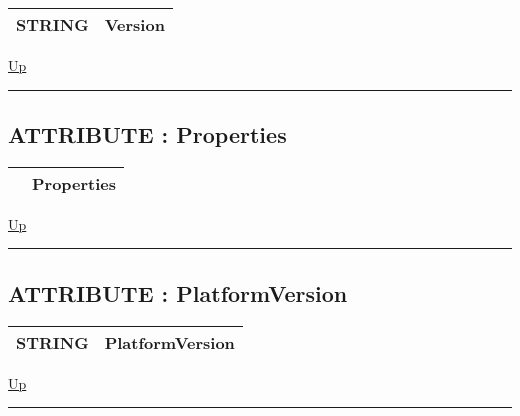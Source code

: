 {\renewcommand{\arraystretch}{1.5}
\begin{tabularx}{\textwidth}{|>{\raggedright\arraybackslash}l|X|}
\hline
\hspace{0pt}STRING & Version \\
\hline
\end{tabularx}
}

\hyperlink{ecldoc:BundleBase}{Up}

\par


\rule{\textwidth}{0.4pt}
\subsection*{ATTRIBUTE : Properties}
\hypertarget{ecldoc:bundlebase.properties}{}

{\renewcommand{\arraystretch}{1.5}
\begin{tabularx}{\textwidth}{|>{\raggedright\arraybackslash}l|X|}
\hline
\hspace{0pt} & Properties \\
\hline
\end{tabularx}
}

\hyperlink{ecldoc:BundleBase}{Up}

\par


\rule{\textwidth}{0.4pt}
\subsection*{ATTRIBUTE : PlatformVersion}
\hypertarget{ecldoc:bundlebase.platformversion}{}

{\renewcommand{\arraystretch}{1.5}
\begin{tabularx}{\textwidth}{|>{\raggedright\arraybackslash}l|X|}
\hline
\hspace{0pt}STRING & PlatformVersion \\
\hline
\end{tabularx}
}

\hyperlink{ecldoc:BundleBase}{Up}

\par


\rule{\textwidth}{0.4pt}


